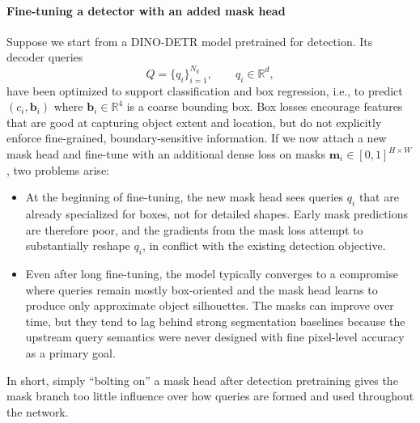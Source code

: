 \begin{enrichment}
\begin{enrichment}
		\paragraph{Fine-tuning a detector with an added mask head}
		Suppose we start from a DINO-DETR model pretrained for detection. Its decoder queries
		\[
		Q = \{q_i\}_{i=1}^{N_q}, \qquad q_i \in \mathbb{R}^d,
		\]
		have been optimized to support classification and box regression, i.e., to predict $(c_i, \mathbf{b}_i)$ where $\mathbf{b}_i \in \mathbb{R}^4$ is a coarse bounding box. Box losses encourage features that are good at capturing object extent and location, but do not explicitly enforce fine-grained, boundary-sensitive information. If we now attach a new mask head and fine-tune with an additional dense loss on masks $\mathbf{m}_i \in [0,1]^{H \times W}$, two problems arise:
		\begin{itemize}
			\item At the beginning of fine-tuning, the new mask head sees queries $q_i$ that are already specialized for boxes, not for detailed shapes. Early mask predictions are therefore poor, and the gradients from the mask loss attempt to substantially reshape $q_i$, in conflict with the existing detection objective.
			\item Even after long fine-tuning, the model typically converges to a compromise where queries remain mostly box-oriented and the mask head learns to produce only approximate object silhouettes. The masks can improve over time, but they tend to lag behind strong segmentation baselines because the upstream query semantics were never designed with fine pixel-level accuracy as a primary goal.
		\end{itemize}
		In short, simply “bolting on” a mask head after detection pretraining gives the mask branch too little influence over how queries are formed and used throughout the network.
		

\end{enrichment}
\end{enrichment}
